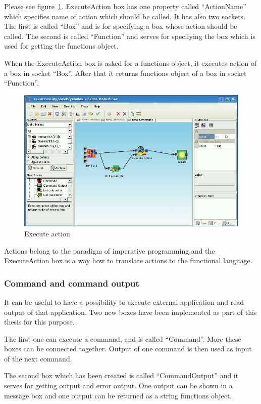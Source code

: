 \documentclass[a4paper,12pt]{book}
\begin{document}
Please see figure~\ref{fig:boxExecuteAction}. ExecuteAction box has one property called ``ActionName'' which specifies name of action which should be called. It has also two sockets. The first is called ``Box'' and is for specifying a box whose action should be called. The second is called ``Function'' and serves for specifying the box which is used for getting the functions object.

When the ExecuteAction box is asked for a functions object, it executes action of a box in socket ``Box''. After that it returns functions object of a box in socket ``Function''.

\begin{figure}
	\includegraphics[width=1\textwidth]{executeAction2.png}
	\caption{Execute action}
	\label{fig:boxExecuteAction}
\end{figure}

Actions belong to the paradigm of imperative programming and the ExecuteAction box is a way how to translate actions to the functional language. 

\subsubsection{Command and command output}
It can be useful to have a possibility to execute external application and read output of that application. Two new boxes have been implemented as part of this thesis for this purpose.

The first one can execute a command, and is called ``Command''. More these boxes can be connected together. Output of one command is then used as input of the next command.

The second box which has been created is called ``CommandOutput'' and it serves for getting output and error output. One output can be shown in a message box and one output can be returned as a string functions object.
\end{document}
